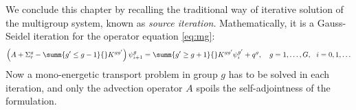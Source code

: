 We conclude this chapter by recalling the traditional way of iterative solution of the multigroup system, known as 
\textit{source iteration}. Mathematically, it is a Gauss-Seidel iteration for the operator equation \eqref{eq:mg}:
$$
  \left(A + \Sigma_r^g - \summ{g'\leq g-1}{} K^{gg'}\right)\psi^g_{i+1} = \summ{g' \geq g+1}{} K^{gg'}\psi^{g'}_{i} + q^g,\quad g = 1,\ldots,G,\ \ i = 0,1,\ldots
$$
Now a mono-energetic transport problem in group $g$ has to be solved in each iteration, and only the advection operator 
$A$ spoils the self-adjointness of the formulation. 


